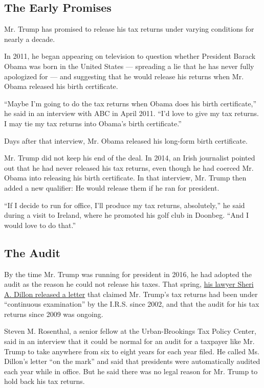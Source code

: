 \hypertarget{the-early-promises}{%
\subsection{The Early Promises}\label{the-early-promises}}

Mr. Trump has promised to release his tax returns under varying
conditions for nearly a decade.

In 2011, he began appearing on television to question whether President
Barack Obama was born in the United States --- spreading a lie that he
has never fully apologized for --- and suggesting that he would release
his returns when Mr. Obama released his birth certificate.

``Maybe I'm going to do the tax returns when Obama does his birth
certificate,'' he said in an interview with ABC in April 2011. ``I'd
love to give my tax returns. I may tie my tax returns into Obama's birth
certificate.''

Days after that interview, Mr. Obama released his long-form birth
certificate.

Mr. Trump did not keep his end of the deal. In 2014, an Irish journalist
pointed out that he had never released his tax returns, even though he
had coerced Mr. Obama into releasing his birth certificate. In that
interview, Mr. Trump then added a new qualifier: He would release them
if he ran for president.

``If I decide to run for office, I'll produce my tax returns,
absolutely,'' he said during a visit to Ireland, where he promoted his
golf club in Doonbeg. ``And I would love to do that.''

\hypertarget{the-audit}{%
\subsection{The Audit}\label{the-audit}}

By the time Mr. Trump was running for president in 2016, he had adopted
the audit as the reason he could not release his taxes. That spring,
\href{https://assets.donaldjtrump.com/Tax_Doc.pdf}{his lawyer Sheri A.
Dillon released a letter} that claimed Mr. Trump's tax returns had been
under ``continuous examination'' by the I.R.S. since 2002, and that the
audit for his tax returns since 2009 was ongoing.

Steven M. Rosenthal, a senior fellow at the Urban-Brookings Tax Policy
Center, said in an interview that it could be normal for an audit for a
taxpayer like Mr. Trump to take anywhere from six to eight years for
each year filed. He called Ms. Dillon's letter ``on the mark'' and said
that presidents were automatically audited each year while in office.
But he said there was no legal reason for Mr. Trump to hold back his tax
returns.

